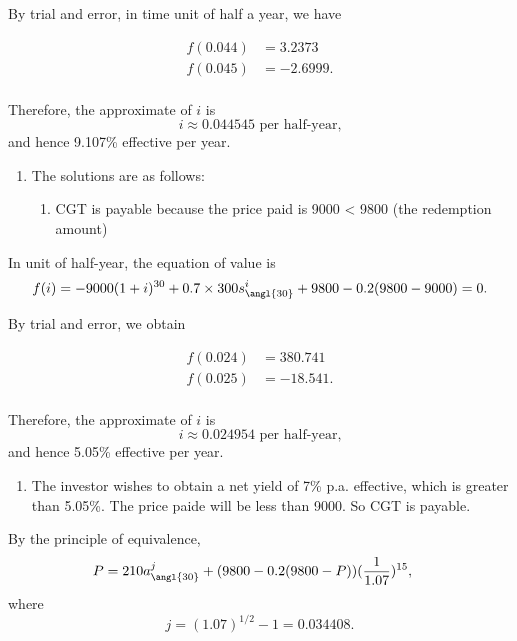 \documentclass[
]{book}
\providecommand{\tightlist}{%
  \setlength{\itemsep}{0pt}\setlength{\parskip}{0pt}}
\theoremstyle{definition}
\theoremstyle{definition}
\theoremstyle{definition}
\theoremstyle{definition}
\theoremstyle{remark}
\begin{document}
By trial and error, in time unit of half a year, we have

\[
\begin{aligned}
f(0.044) &= 3.2373 \\
f(0.045) &= -2.6999. \\
\end{aligned}
\]

Therefore, the approximate of \(i\) is
\[ i \approx 0.044545 \text{ per half-year,} \]
and hence 9.107\% effective per year.

\begin{enumerate}
\def\labelenumi{\arabic{enumi}.}
\setcounter{enumi}{3}
\item
  The solutions are as follows:

  \begin{enumerate}
  \def\labelenumii{\arabic{enumii}.}
  \tightlist
  \item
    CGT is payable because the price paid is 9000 \textless{} 9800 (the redemption amount)
  \end{enumerate}
\end{enumerate}

In unit of half-year, the equation of value is
\[ f(i) = -9000 (1 + i)^{30} + 0.7 \times 300  s^i_{\angl{30}} + 9800 - 0.2(9800 - 9000) = 0.\]

By trial and error, we obtain

\[
\begin{aligned}
f(0.024) &= 380.741 \\
f(0.025) &= -18.541. \\
\end{aligned}
\]

Therefore, the approximate of \(i\) is
\[ i \approx 0.024954 \text{ per half-year,} \]
and hence 5.05\% effective per year.

\begin{enumerate}
\def\labelenumi{\arabic{enumi}.}
\setcounter{enumi}{1}
\tightlist
\item
  The investor wishes to obtain a net yield of 7\% p.a. effective, which is greater than 5.05\%. The price paide will be less than 9000. So CGT is payable.
\end{enumerate}

By the principle of equivalence,
\[
\begin{aligned}
P &= 210 a^j_{\angl{30}} + (9800 - 0.2(9800 - P)) (\frac{1}{1.07})^{15}, 
\end{aligned}
\]
where \[j = (1.07)^{1/2} - 1 = 0.034408.\]
\end{document}
